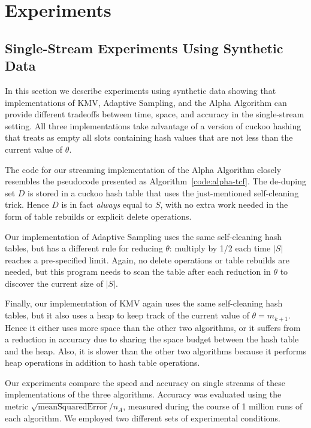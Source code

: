 \documentclass{article}
\begin{document}
\section{Experiments}
\subsection{Single-Stream Experiments Using Synthetic Data}
\label{sec:experiments}
\label{app:experiments}



In this section we describe experiments using synthetic data
showing that implementations of KMV, Adaptive Sampling, and the Alpha Algorithm can provide different tradeoffs
between time, space, and accuracy in the single-stream setting.
All three implementations take advantage of a version of cuckoo hashing
that treats as empty all slots containing hash values that are not
less than the current value of $\theta$.

The code for our streaming implementation of the Alpha Algorithm
closely resembles the pseudocode presented as Algorithm~\ref{code:alpha-tcf}.
The de-duping set $D$ is stored in a cuckoo hash table that uses the just-mentioned self-cleaning
trick. Hence $D$ is in fact {\em always} equal to $S$, with no extra
work needed in the form of table rebuilds or explicit delete operations.

Our implementation of Adaptive Sampling uses the same self-cleaning
hash tables, but has a different rule for reducing $\theta$: multiply by 1/2
each time $|S|$ reaches a pre-specified limit. Again, no delete operations
or table rebuilds are needed, but this program needs to scan the table
after each reduction in $\theta$ to discover the current size of $|S|$.

Finally, our implementation of KMV again uses the same self-cleaning
hash tables, but it also uses a heap to keep track of the current
value of $\theta = m_{k+1}$. Hence it either uses more space than
the other two algorithms, or it suffers from a reduction in
accuracy due to sharing the space budget between the hash table
and the heap. Also, it is slower than the other two algorithms
because it performs heap operations in addition to hash table
operations.

Our experiments compare the speed and accuracy on single streams
of these implementations of the three algorithms. 
Accuracy was evaluated using the metric $\sqrt{\mathrm{meanSquaredError}}/n_A$,
measured during the course of 1 million runs of each algorithm.
We employed two different sets of experimental conditions. 
\end{document}
